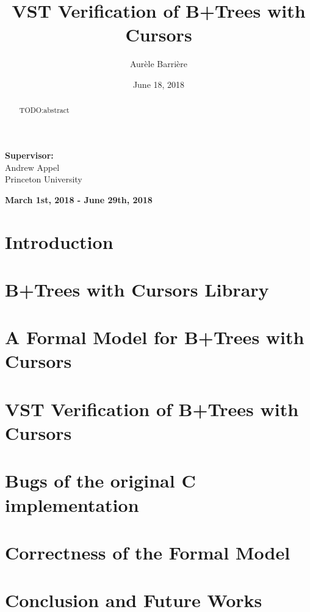 \documentclass{llncs2e/llncs}
\begin{document}
\setcounter{page}{0}
\pagestyle{headings}
\title{VST Verification of B+Trees with Cursors}
\author{Aur\`ele Barri\`ere}
\date{June 18, 2018}
\maketitle
\hrulefill
\begin{center}
  \textbf{Supervisor: }\\
  Andrew Appel
  ~\\
  Princeton University
\end{center}
\hrulefill
\begin{center}
  \textbf{March 1st, 2018 - June 29th, 2018}
\end{center}
\vfill
\begin{abstract}
  TODO:abstract
\end{abstract}
\vfill
\newpage

\def\btree{B+Tree}
\def\btrees{B+Trees}
\def\todo#1{{\color{red}#1}}

\section{Introduction}
\label{sec:intro}


\section{B+Trees with Cursors Library}
\label{sec:btrees}


\section{A Formal Model for B+Trees with Cursors}
\label{sec:model}


\section{VST Verification of B+Trees with Cursors}
\label{sec:verif}


\section{Bugs of the original C implementation}
\label{sec:bugs}


\section{Correctness of the Formal Model}
\label{sec:spec}


\section{Conclusion and Future Works}
\label{sec:conclusion}


\newpage
{}
\nocite{*}


\end{document}
